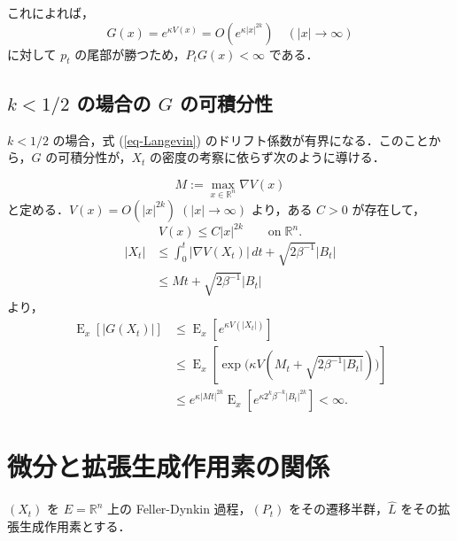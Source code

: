 \documentclass[
]{article}
\begin{document}
これによれば， \[
G(x)=e^{\kappa V(x)}=O(e^{\kappa\lvert x\rvert^{2k}})\quad(\lvert x\rvert\to\infty)
\] に対して \(p_t\) の尾部が勝つため，\(P_tG(x)<\infty\) である．

\subsection{\texorpdfstring{\(k<1/2\) の場合の \(G\)
の可積分性}{k\textless1/2 の場合の G の可積分性}}\label{k12-ux306eux5834ux5408ux306e-g-ux306eux53efux7a4dux5206ux6027}

\(k<1/2\) の場合，式 (\ref{eq-Langevin})
のドリフト係数が有界になる．このことから，\(G\) の可積分性が，\(X_t\)
の密度の考察に依らず次のように導ける．

\[
M:=\max_{x\in\mathbb{R}^n}\nabla V(x)
\] と定める．\(V(x)=O(\lvert x\rvert^{2k})\;(\lvert x\rvert\to\infty)\)
より，ある \(C>0\) が存在して， \[
V(x)\le C\lvert x\rvert^{2k}\qquad\mathrm{on}\;\mathbb{R}^n.
\] \begin{align*}
    \lvert X_t\rvert&\le\int^t_0\lvert\nabla V(X_t)\rvert\,dt+\sqrt{2\beta^{-1}}\lvert B_t\rvert\\
    &\le Mt+\sqrt{2\beta^{-1}}\lvert B_t\rvert
\end{align*} より， \begin{align*}
    \operatorname{E}_x[\lvert G(X_t)\rvert]&\le\operatorname{E}_x\left[e^{\kappa V(\lvert X_t\rvert)}\right]\\
    &\le\operatorname{E}_x\left[\exp\biggr(\kappa V(M_t+\sqrt{2\beta^{-1}\lvert B_t\rvert})\biggl)\right]\\
    &\le e^{\kappa\lvert Mt\rvert^{2k}}\operatorname{E}_x\left[e^{\kappa 2^k\beta^{-k}\lvert B_t\rvert^{2k}}\right]<\infty.
\end{align*}

\section{微分と拡張生成作用素の関係}\label{sec-extended-generator}

\((X_t)\) を \(E=\mathbb{R}^n\) 上の Feller-Dynkin 過程，\((P_t)\)
をその遷移半群，\(\widehat{L}\) をその拡張生成作用素とする．
\end{document}
